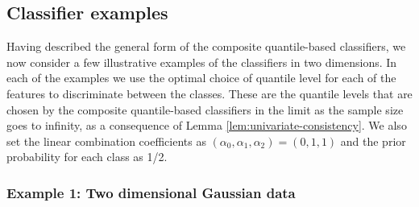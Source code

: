 

\subsection{Classifier examples}
\label{sec:classifier-examples}

Having described the general form of the composite quantile-based classifiers,
we now consider a few illustrative examples of the classifiers in two
dimensions.  In each of the examples we use the optimal choice of quantile level
for each of the features to discriminate between the classes.  These are the
quantile levels that are chosen by the composite quantile-based classifiers in
the limit as the sample size goes to infinity, as a consequence of Lemma
\ref{lem:univariate-consistency}.  We also set the linear combination
coefficients as $(\alpha_0, \alpha_1, \alpha_2) = (0, 1, 1)$ and the prior
probability for each class as 1/2.


\subsubsection*{Example 1:  Two dimensional Gaussian data}
\label{sec:classifier-examples-gaussian}

